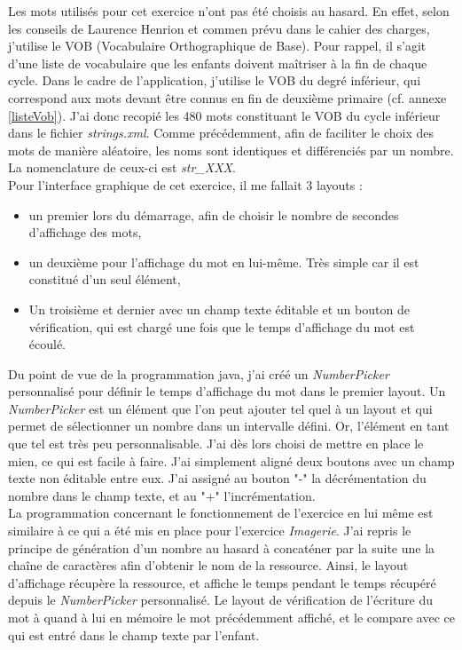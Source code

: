 Les mots utilisés pour cet exercice n'ont pas été choisis au hasard. En effet, selon les conseils de Laurence Henrion et commen prévu dans le cahier des charges, j'utilise le VOB (Vocabulaire Orthographique de Base). Pour rappel, il s'agit d'une liste de vocabulaire que les enfants doivent maîtriser à la fin de chaque cycle. Dans le cadre de l'application, j'utilise le VOB du degré inférieur, qui correspond aux mots devant être connus en fin de deuxième primaire (cf. annexe \ref{listeVob}). J'ai donc recopié les 480 mots constituant le VOB du cycle inférieur dans le fichier \textit{strings.xml}. Comme précédemment, afin de faciliter le choix des mots de manière aléatoire, les noms sont identiques et différenciés par un nombre. La nomenclature de ceux-ci est \textit{str\_XXX}. \\

Pour l'interface graphique de cet exercice, il me fallait 3 layouts :
\begin{itemize}
\item un premier lors du démarrage, afin de choisir le nombre de secondes d'affichage des mots,
\item un deuxième pour l'affichage du mot en lui-même. Très simple car il est constitué d'un seul élément,
\item Un troisième et dernier avec un champ texte éditable et un bouton de vérification, qui est chargé une fois que le temps d'affichage du mot est écoulé.\\
\end{itemize}

Du point de vue de la programmation java, j'ai créé un \textit{NumberPicker} personnalisé pour définir le temps d'affichage du mot dans le premier layout. Un \textit{NumberPicker} est un élément que l'on peut ajouter tel quel à un layout et qui permet de sélectionner un nombre dans un intervalle défini. Or, l'élément en tant que tel est très peu personnalisable. J'ai dès lors choisi de mettre en place le mien, ce qui est facile à faire. J'ai simplement aligné deux boutons avec un champ texte non éditable entre eux. J'ai assigné au bouton "-" la décrémentation du nombre dans le champ texte, et au "+" l'incrémentation.\\

La programmation concernant le fonctionnement de l'exercice en lui même est similaire à ce qui a été mis en place pour l'exercice \textit{Imagerie}. J'ai repris le principe de génération d'un nombre au hasard à concaténer par la suite une la chaîne de caractères afin d'obtenir le nom de la ressource. Ainsi, le layout d'affichage récupère la ressource, et affiche le temps pendant le temps récupéré depuis le \textit{NumberPicker} personnalisé. Le layout de vérification de l'écriture du mot à quand à lui en mémoire le mot précédemment affiché, et le compare avec ce qui est entré dans le champ texte par l'enfant.\\

